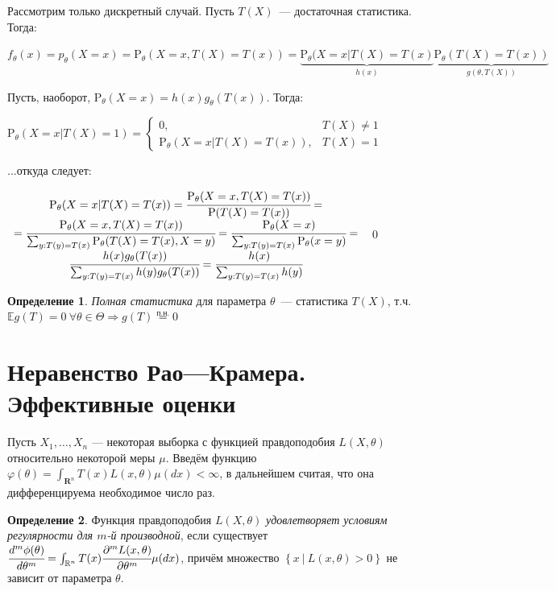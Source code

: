 \documentclass[oneside,final,14pt]{extreport}
\renewenvironment{proof}{{\bfseries Доказательство.}}{\qed}
\theoremstyle{definition}
\newtheorem{defn}{Определение}[section]
\begin{document}
\begin{proof}
Рассмотрим только дискретный случай. Пусть \( T(X) \)~--- достаточная статистика. Тогда:

\( f_{\theta}(x)=p_{\theta}(X=x)=\mathrm{P}_{\theta}(X=x, T(X)=T(x))=\underbrace{\mathrm{P}_{\theta}(X=x | T(X)=T(x)}_{h(x)} \underbrace{\mathrm{P}_{\theta}(T(X)=T(x))}_{g(\theta, T(X))} \)

Пусть, наоборот, \( \mathrm{P}_{\theta}(X=x)=h(x) g_{\theta}(T(x)) \). Тогда:

\( \mathrm{P}_{\theta}(X=x | T(X)=1)=\left\{\begin{array}{ll}
0, & T(X) \neq 1 \\
\mathrm{P}_{\theta}(X=x | T(X)=T(x)), & T(X)=1
\end{array}\right. \)

...откуда следует:

\( \begin{array}{c}
\mathrm{P}_{\theta}(X=x | T(X)=T(x)) = \cfrac{\mathrm{P}_{\theta}(X=x, T(X)=T(x))}{\mathrm{P}(T(X)=T(x))}= \\
= \cfrac{\mathrm{P}_{\theta}(X=x, T(X)=T(x))}{\sum_{y: T(y)=T(x)} \mathrm{P}_{\theta}(T(X)=T(x), X=y)}= \cfrac{\mathrm{P}_{\theta}(X=x)}{\sum_{y: T(y)=T(x)} \mathrm{P}_{\theta}(x=y)}=\\
\cfrac{h(x) g_{\theta}(T(x))}{\sum_{y: T(y)=T(x)} h(y) g_{\theta}(T(x))}=\cfrac{h(x)}{\sum_{y: T(y)=T(x)} h(y)}
\end{array} \)
\end{proof}

\begin{defn}
{\it Полная статистика} для параметра \( \theta \)~--- статистика \( T(X) \), т.ч. \( \mathbb{E} g(T)=0~\forall \theta \in \Theta \Rightarrow g(T) \stackrel{\text{п.н.}}{=}0\)
\end{defn}

\section{Неравенство Рао—Крамера. Эффективные оценки}

Пусть \( X_1, \ldots, X_n \)  —  некоторая выборка с функцией правдоподобия \( L(X, \theta)\) относительно некоторой меры \( \mu \). Введём функцию \( \varphi(\theta)=\int_{\mathbf{R}^{n}} T(x) L(x, \theta) \mu(d x)<\infty \), в дальнейшем считая, что она дифференцируема необходимое число раз.

\begin{defn}
Функция правдоподобия \( L(X, \theta)\) {\it удовлетворяет условиям регулярности для \(m\)-й производной}, если существует \(\cfrac{d^{m} \phi(\theta)}{d \theta^{m}}=\int_{\mathbb{R}^{n}} T(x) \cfrac{\partial^{m} L(x, \theta)}{\partial \theta^{m}} \mu(d x) \), причём множество \( \left\{ {x~|~L(x,\theta) > 0} \right\} \) не зависит от параметра \(\theta\).
\end{defn}
\end{document}
